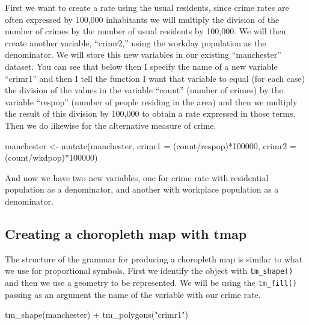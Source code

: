 \documentclass[
]{book}
\newenvironment{Shaded}{\begin{snugshade}}{\end{snugshade}}
\newcommand{\AttributeTok}[1]{\textcolor[rgb]{0.77,0.63,0.00}{#1}}
\newcommand{\DecValTok}[1]{\textcolor[rgb]{0.00,0.00,0.81}{#1}}
\newcommand{\FunctionTok}[1]{\textcolor[rgb]{0.00,0.00,0.00}{#1}}
\newcommand{\NormalTok}[1]{#1}
\newcommand{\OtherTok}[1]{\textcolor[rgb]{0.56,0.35,0.01}{#1}}
\newcommand{\SpecialCharTok}[1]{\textcolor[rgb]{0.00,0.00,0.00}{#1}}
\newcommand{\StringTok}[1]{\textcolor[rgb]{0.31,0.60,0.02}{#1}}
\begin{document}
First we want to create a rate using the usual residents, since crime rates are often expressed by 100,000 inhabitants we will multiply the division of the number of crimes by the number of usual residents by 100,000. We will then create another variable, ``crimr2,'' using the workday population as the denominator. We will store this new variables in our existing ``manchester'' dataset. You can see that below then I specify the name of a new variable ``crimr1'' and then I tell the function I want that variable to equal (for each case) the division of the values in the variable ``count'' (number of crimes) by the variable ``respop'' (number of people residing in the area) and then we multiply the result of this division by 100,000 to obtain a rate expressed in those terms. Then we do likewise for the alternative measure of crime.

\begin{Shaded}
\begin{Highlighting}[]
\NormalTok{manchester }\OtherTok{\textless{}{-}} \FunctionTok{mutate}\NormalTok{(manchester, }\AttributeTok{crimr1 =}\NormalTok{ (count}\SpecialCharTok{/}\NormalTok{respop)}\SpecialCharTok{*}\DecValTok{100000}\NormalTok{, }\AttributeTok{crimr2 =}\NormalTok{ (count}\SpecialCharTok{/}\NormalTok{wkdpop)}\SpecialCharTok{*}\DecValTok{100000}\NormalTok{)}
\end{Highlighting}
\end{Shaded}

And now we have two new variables, one for crime rate with residential population as a denominator, and another with workplace population as a denominator.

\hypertarget{creating-a-choropleth-map-with-tmap}{%
\subsection{Creating a choropleth map with tmap}\label{creating-a-choropleth-map-with-tmap}}

The structure of the grammar for producing a choropleth map is similar to what we use for proportional symbols. First we identify the object with \texttt{tm\_shape()} and then we use a geometry to be represented. We will be using the \texttt{tm\_fill()} passing as an argument the name of the variable with our crime rate.

\begin{Shaded}
\begin{Highlighting}[]
\FunctionTok{tm\_shape}\NormalTok{(manchester) }\SpecialCharTok{+} 
  \FunctionTok{tm\_polygons}\NormalTok{(}\StringTok{"crimr1"}\NormalTok{)}
\end{Highlighting}
\end{Shaded}
\end{document}
